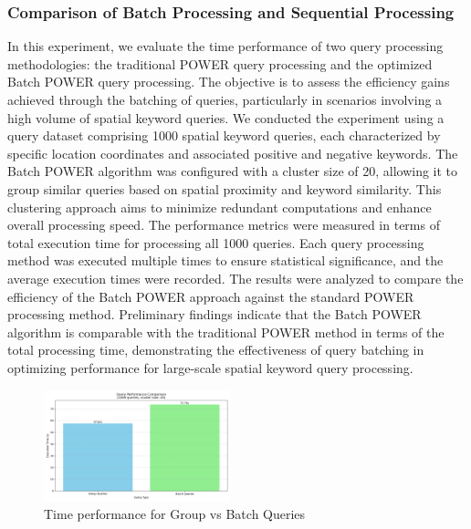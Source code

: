 \documentclass[conference]{IEEEtran}
\begin{document}
\subsubsection{Comparison of Batch Processing and Sequential Processing}
In this experiment, we evaluate the time performance of two query processing methodologies: the traditional POWER query processing and the optimized Batch POWER query processing. The objective is to assess the efficiency gains achieved through the batching of queries, particularly in scenarios involving a high volume of spatial keyword queries.
We conducted the experiment using a query dataset comprising 1000 spatial keyword queries, each characterized by specific location coordinates and associated positive and negative keywords. The Batch POWER algorithm was configured with a cluster size of 20, allowing it to group similar queries based on spatial proximity and keyword similarity. This clustering approach aims to minimize redundant computations and enhance overall processing speed.
The performance metrics were measured in terms of total execution time for processing all 1000 queries. Each query processing method was executed multiple times to ensure statistical significance, and the average execution times were recorded. The results were analyzed to compare the efficiency of the Batch POWER approach against the standard POWER processing method.
Preliminary findings indicate that the Batch POWER algorithm is comparable with the traditional POWER method in terms of the total processing time, demonstrating the effectiveness of query batching in optimizing performance for large-scale spatial keyword query processing.

\begin{figure}[htbp]
    \centering
    \includegraphics[width=0.48\textwidth]{Time_vs_Query.png}
    \caption{Time performance for Group vs Batch Queries}
    \label{fig:3}
\end{figure}
\end{document}
